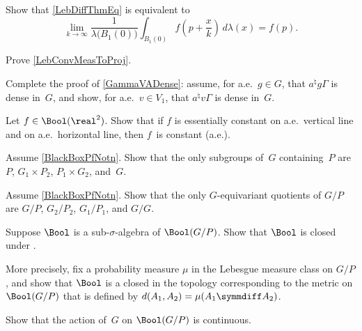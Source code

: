 \begin{exercises}
\item \label{LebDiffThmEquivEx}
Show that \cref{LebDiffThmEq} is equivalent to
	$$ \lim_{k \to \infty} \frac{1}{\lambda \bigl( B_1(0) \bigr)} \int_{B_1(0)} f\left(p + \frac{x}{k}\right) \, d\lambda(x)= f(p) .$$

\item \label{LebConvMeasToProjPfEx}
Prove \cref{LebConvMeasToProj}.
 
 \item \label{a^nvGammaDenseEx}
 Complete the proof of \cref{GammaVADense}: assume, for a.e.\ $g \in G$, that $a^{\natural} g \Gamma$ is dense in~$G$, and show, for a.e.\ $v \in V_1$, that $a^{\natural} v \Gamma$ is dense in~$G$.

\item \label{ConstVert+Horiz->Const}
Let $f \in \Bool(\real^2)$. Show that if $f$ is essentially constant on a.e.\ vertical line and on a.e.\ horizontal line, then $f$~is constant (a.e.).
 
 \item \label{ParabolicsInSL2xSL2Ex}
Assume \cref{BlackBoxPfNotn}. Show that the only subgroups of~$G$ containing~$P$ are  $P$, $G_1\times P_2$, $P_1\times G_2$, and~$G$. 

\item \label{EquivQuotsSL2xSL2/PEx}
Assume \cref{BlackBoxPfNotn}. 
Show that the only $G$-equivariant quotients of $G/P$ are
	$G/P$, $G_2/P_2$, $G_1/P_1$, and $G/G$.

\item \label{WeakClosed->ConvMeasEx}
Suppose $\Bool$ is a sub-$\sigma$-algebra of $\Bool(G/P)$. Show that $\Bool$ is closed under . 
\par
More precisely, fix a probability measure $\mu$ in the Lebesgue measure class on $G/P$, and show that $\Bool$ is a closed in the topology corresponding to the metric on $\Bool(G/P)$ that is defined by $d(A_1,A_2) = \mu( A_1 \symmdiff A_2)$. 

\item \label{ContOnB(G/P)}
Show that the action of~$G$ on $\Bool(G/P)$ is continuous.


\end{exercises}
